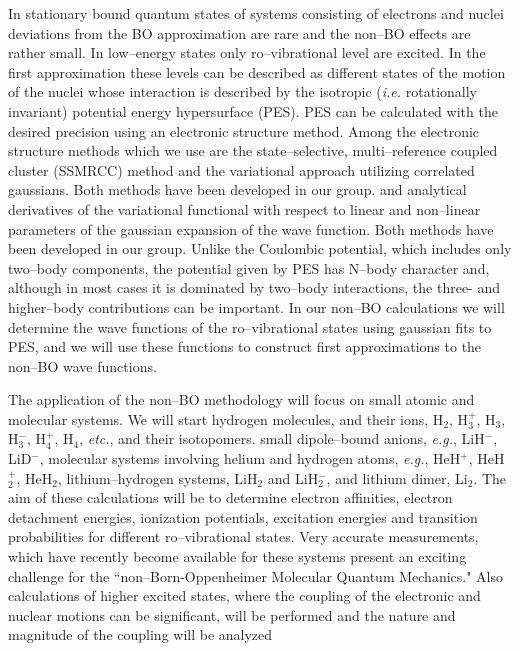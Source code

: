 In 
stationary bound
quantum states of 
systems 
consisting of electrons and nuclei
deviations from the BO approximation
are rare and the non--BO effects
are rather small. 
In low--energy states only  
ro--vibrational level are excited.
In the first approximation  these levels can be
described as different states of the motion
of the nuclei whose interaction is described by the
isotropic ({\it i.e.} rotationally invariant)
potential energy hypersurface (PES).
PES can be calculated with the desired precision using
an electronic structure method.
Among the electronic structure methods which we
use are
the state--selective, multi--reference coupled cluster (SSMRCC)
method and the variational approach utilizing correlated gaussians.
Both methods have been developed in our group. 
and analytical derivatives of the variational functional with
respect to linear and non--linear parameters of the gaussian
expansion of the wave function.
Both methods have been developed in our group.
Unlike the Coulombic potential, which includes only two--body
components, the potential given by PES has N--body character and,
although in most cases it is dominated by two--body interactions,
the three- and higher--body contributions can be important.
In our non--BO calculations we will determine the
wave functions of the ro--vibrational states using
gaussian fits to PES, and we will use these functions
to construct first approximations to the non--BO wave functions.


The application of the non--BO 
methodology 
will focus on
small atomic and molecular systems.
We will start
hydrogen molecules, and their ions,
H$_2$, H$_3^+$, H$_3$, H$_3^-$, H$_4^+$, H$_4$, {\it etc.},
and their isotopomers. 
small dipole--bound anions, {\it e.g.}, LiH$^-$, LiD$^-$,
molecular systems involving 
helium and hydrogen atoms, {\it e.g.}, HeH$^+$, HeH$_2^+$, HeH$_2$,
lithium--hydrogen systems, LiH$_2$ and LiH$_2^-$,
and lithium dimer, Li$_2$.  
The aim of these calculations will be to determine 
electron affinities, electron detachment energies,
ionization potentials, excitation energies and transition probabilities 
for different ro--vibrational states.
Very accurate measurements, which have 
recently become
available 
for these systems
present an exciting challenge for 
the ``non--Born-Oppenheimer Molecular Quantum Mechanics."
Also calculations of 
higher excited states,
where the coupling of the electronic and nuclear motions
can be significant, 
will be performed and the nature and magnitude of the 
coupling will be analyzed

